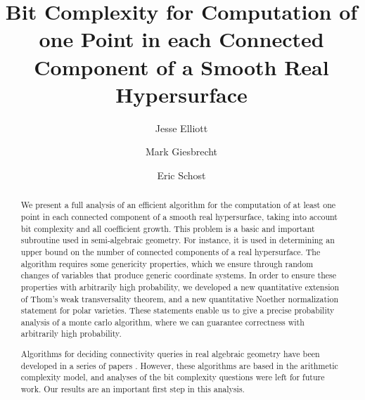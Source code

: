 \documentclass[sigconf]{acmart}
\begin{document}
\title{Bit Complexity for Computation of one Point in each Connected Component of a Smooth Real Hypersurface}

\author{Jesse Elliott}

\author{Mark Giesbrecht}

\author{Eric Schost}
\renewcommand{\shortauthors}{Elliott, Giesbrecht, and Schost.}

\begin{abstract}
 We present a full analysis of an efficient algorithm for the
 computation of at least one point in each connected component of a
 smooth real hypersurface, taking into account bit complexity and
 all coefficient growth.  This problem is a basic and important
 subroutine used in semi-algebraic geometry. For instance, it is used
 in determining an upper bound on the number of connected components
 of a real hypersurface. The algorithm requires some genericity
 properties, which we ensure through random changes of variables that
 produce generic coordinate systems. In order to ensure these
 properties with arbitrarily high probability, we developed a new
 quantitative extension of Thom's weak transversality theorem, and a
 new quantitative Noether normalization statement for polar
 varieties. These statements enable us to give a precise probability
 analysis of a monte carlo algorithm, where we can guarantee
correctness with arbitrarily high probability.
\par 
  Algorithms for deciding connectivity queries in real algebraic
  geometry have been developed in a series of papers
  \cite{a,b,c,d}. However, these algorithms are based in the
  arithmetic complexity model, and analyses of the bit complexity
  questions were left for future work.  Our results are an important
  first step in this analysis.
\end{abstract}
\end{document}
